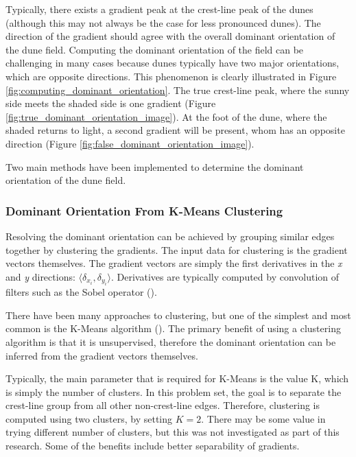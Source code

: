  Typically, there exists a gradient peak at the crest-line peak of the dunes (although this may not always be the case for less pronounced dunes). The direction of the gradient should agree with the overall dominant orientation of the dune field. Computing the dominant orientation of the field can be challenging in many cases because dunes typically have two major orientations, which are opposite directions. This phenomenon is clearly illustrated in Figure \ref{fig:computing_dominant_orientation}. The true crest-line peak, where the sunny side meets the shaded side is one gradient (Figure \ref{fig:true_dominant_orientation_image}). At the foot of the dune, where the shaded returns to light, a second gradient will be present, whom has an opposite direction (Figure \ref{fig:false_dominant_orientation_image}).
 
 Two main methods have been implemented to determine the dominant orientation of the dune field.
 
 \subsubsection{Dominant Orientation From K-Means Clustering}\label{subsec:dominant_orientation_k_means}
 
 Resolving the dominant orientation can be achieved by grouping similar edges together by clustering the gradients.  The input data for clustering is the gradient vectors themselves. The gradient vectors are simply the first derivatives in the \emph{x} and \emph{y} directions: $\langle \delta_{x_{i}}, \delta_{y_{i}} \rangle$. Derivatives are typically computed by convolution of filters such as the Sobel operator (\cite{2014_history_sobel_operator}).
 
 There have been many approaches to clustering, but one of the simplest and most common is the K-Means algorithm (\cite{1965_Cluster_analysis_multivariate_data,1982_least_square_quantization_pcm,1967_method_classification_analysis_multivariate_observations}). The primary benefit of using a clustering algorithm is that it is unsupervised, therefore the dominant orientation can be inferred from the gradient vectors themselves.
 
 Typically, the main parameter that is required for K-Means is the value K, which is simply the number of clusters. In this problem set, the goal is to separate the crest-line group from all other non-crest-line edges. Therefore, clustering is computed using two clusters, by setting $K=2$. There may be some value in trying different number of clusters, but this was not investigated as part of this research. Some of the benefits include better separability of gradients.
 
